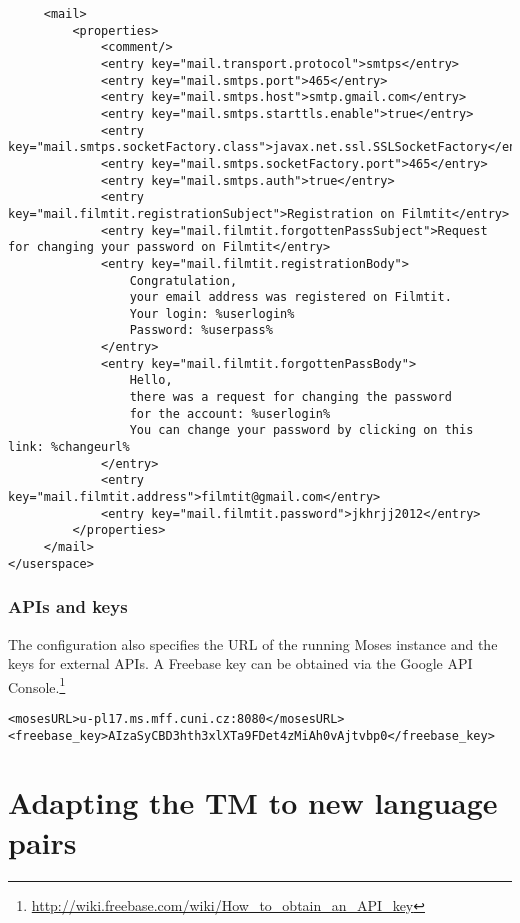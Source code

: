 \begin{lstlisting}
     <mail>
         <properties>
             <comment/>
             <entry key="mail.transport.protocol">smtps</entry>
             <entry key="mail.smtps.port">465</entry>
             <entry key="mail.smtps.host">smtp.gmail.com</entry>
             <entry key="mail.smtps.starttls.enable">true</entry>
             <entry key="mail.smtps.socketFactory.class">javax.net.ssl.SSLSocketFactory</entry>
             <entry key="mail.smtps.socketFactory.port">465</entry>
             <entry key="mail.smtps.auth">true</entry>
             <entry key="mail.filmtit.registrationSubject">Registration on Filmtit</entry>
             <entry key="mail.filmtit.forgottenPassSubject">Request for changing your password on Filmtit</entry>
             <entry key="mail.filmtit.registrationBody">
                 Congratulation,
                 your email address was registered on Filmtit.
                 Your login: %userlogin%
                 Password: %userpass%
             </entry>
             <entry key="mail.filmtit.forgottenPassBody">
                 Hello,
                 there was a request for changing the password
                 for the account: %userlogin%
                 You can change your password by clicking on this link: %changeurl%
             </entry>
             <entry key="mail.filmtit.address">filmtit@gmail.com</entry>
             <entry key="mail.filmtit.password">jkhrjj2012</entry>
         </properties>
     </mail>
</userspace>
\end{lstlisting}


\subsubsection{APIs and keys}

The configuration also specifies the URL of the running Moses instance and the keys for external APIs. A Freebase key can be obtained via the Google API Console.\footnote{\url{http://wiki.freebase.com/wiki/How_to_obtain_an_API_key}}

\begin{lstlisting}
<mosesURL>u-pl17.ms.mff.cuni.cz:8080</mosesURL>
<freebase_key>AIzaSyCBD3hth3xlXTa9FDet4zMiAh0vAjtvbp0</freebase_key>
\end{lstlisting}


\section{Adapting the TM to new language pairs}
\label{sec:internationalization}


